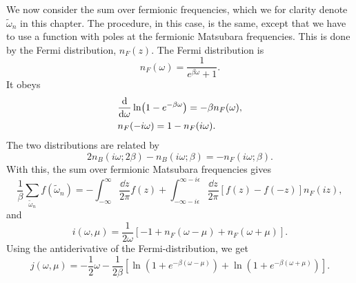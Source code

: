 We now consider the sum over fermionic frequencies, which we for clarity denote $\tilde \omega_n$ in this chapter.
The procedure, in this case, is the same, except that we have to use a function with poles at the fermionic Matsubara frequencies.
This is done by the Fermi distribution, $n_F(z)$.
The Fermi distribution is
\begin{equation}
    n_F(\omega) = \frac{1}{e^{\beta \omega} + 1}.
\end{equation}
It obeys
\begin{align}
    &\odv{}{\omega} \ln(1 - e^{-\beta \omega}) = - \beta n_F(\omega), \\
    & n_F(- i\omega) = 1 - n_F(i\omega).
\end{align}
The two distributions are related by
\begin{equation}
    2 n_B(i \omega; 2\beta) - n_B(i \omega; \beta)
    = - n_F(i \omega; \beta ).
\end{equation}
With this, the sum over fermionic Matsubara frequencies gives
\begin{equation}
    \frac{1}{\beta} \sum_{\tilde \omega_n} f(\tilde \omega_n) 
    = 
    -\int_{-\infty}^{\infty} \frac{\dd z}{2 \pi} f(z)
    +
    \int_{-\infty - i \epsilon}^{\infty - i \epsilon}\frac{\dd z}{2 \pi}
    \left[
        f(z) - f(-z)
    \right]
    n_F(iz),
\end{equation}
and 
\begin{equation}
    i(\omega, \mu) = \frac{1}{2 \omega} [-1 + n_F(\omega - \mu) + n_F(\omega + \mu)].
\end{equation}
Using the antiderivative of the Fermi-distribution, we get
\begin{equation}
    j(\omega, \mu) 
    = - \frac{1}{2} \omega 
    - \frac{1}{2 \beta }
    \left[
        \ln\left(1 + e^{-\beta(\omega - \mu)}\right)
        + \ln\left(1 + e^{-\beta(\omega + \mu)}\right)
    \right].
\end{equation}

